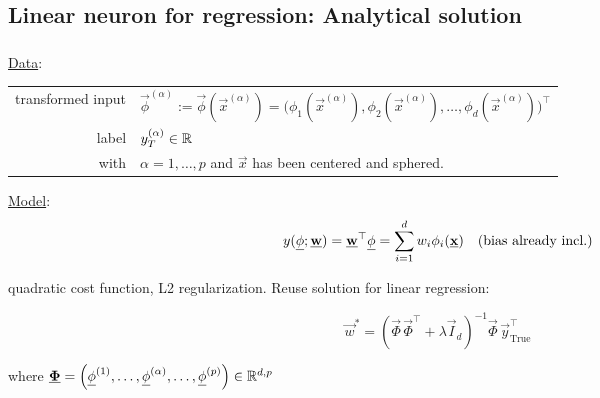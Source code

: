 \subsection{Linear neuron for regression: Analytical solution}

\begin{frame}\frametitle{\subsecname}

\underline{Data}:\\

\begin{table}[h]
\begin{tabular}{rl}
transformed input & $\vec \phi^{(\alpha)} := \vec \phi(\vec x^{(\alpha)}) = \big (
\phi_{1}(\vec x^{(\alpha)}), \phi_{2}(\vec x^{(\alpha)}), \ldots, \phi_{d}(\vec x^{(\alpha)}) \big)^{\top}$ \\
label         & $y_{T}^{(\alpha)} \in \mathbb{R}$ \\
with & $\alpha = 1,\ldots,p$ and $\vec x$ has been centered and sphered.
\end{tabular}
\end{table}

\pause

\underline{Model}:\\[-5mm]

\begin{equation}
    y(\underline{\mathbf{\phi}}; \underline{\mathbf{w}}) = \underline{\mathbf{w}}^{\top} \underline{\mathbf{\phi}} = \sum_{i=1}^{d} w_{i} \phi_{i}(\underline{\mathbf{x}})\quad \text{(bias already incl.)}
\end{equation}

quadratic cost function, L2 regularization. \pause Reuse solution for linear regression:

\begin{equation}
\vec w^{*} = \left( \vec \Phi \, \vec \Phi^{\top} + \lambda \vec I_{d}\right)^{-1} \vec \Phi \, \vec y_{\text{True}}^{\top}
\end{equation}

where $\underline{\mathbf{\Phi}} = \left( \underline{\mathbf{\phi}}^{(1)},\ldots, \underline{\mathbf{\phi}}^{(\alpha)},\ldots, \underline{\mathbf{\phi}}^{(p)}\right) \in \mathbb{R}^{d,p}$

\end{frame}

